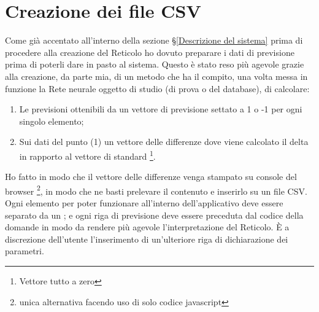 \section{Creazione dei file CSV}
\label{Creazione dei file CSV}
Come gi\`a accentato all'interno della sezione §\ref{Descrizione del sistema} prima di procedere alla creazione del Reticolo ho dovuto preparare i dati di previsione prima di poterli dare in pasto al sistema. Questo \`e stato reso pi\`u agevole grazie alla creazione, da parte mia, di un metodo che ha il compito, una volta messa in funzione la Rete neurale oggetto di studio (di prova o del database), di calcolare:
\begin{enumerate}
\item Le previsioni ottenibili da un vettore di previsione settato a 1 o -1 per ogni singolo elemento;
\item Sui dati del punto (1) un vettore delle differenze dove viene calcolato il delta in rapporto al vettore di standard \footnote{Vettore tutto a zero}.
\end{enumerate}
\noindent
Ho fatto in modo che il vettore delle differenze venga stampato su console del browser \footnote{unica alternativa facendo uso di solo codice javascript}, in modo che ne basti prelevare il contenuto e inserirlo su un file CSV. Ogni elemento per poter funzionare all'interno dell'applicativo deve essere separato da un ; e ogni riga di previsione deve essere preceduta dal codice della domande in modo da rendere pi\`u agevole l'interpretazione del Reticolo. \`E a discrezione dell'utente l'inserimento di un'ulteriore riga di dichiarazione dei parametri.

